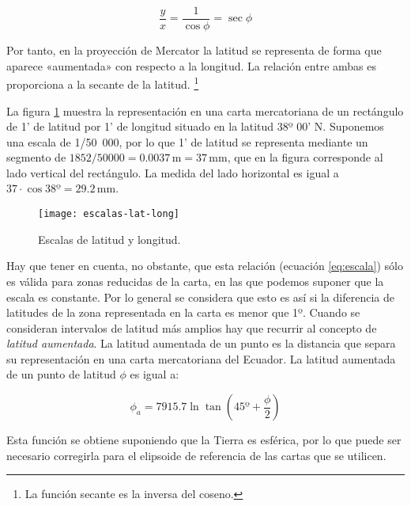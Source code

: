 \begin{equation}
\frac{y}{x} = \frac{1}{\cos \phi} = \sec \phi
\label{eq:escala}
\end{equation}

Por tanto, en la proyección de Mercator la latitud se representa de forma que aparece «aumentada» con respecto a la longitud. La relación entre ambas es proporciona a la secante de la latitud.%
\footnote{La función secante es la inversa del coseno.} 

\begin{ejemplo}
 La figura \ref{fg:escalas-lat-long} muestra la representación en una carta mercatoriana de un rectángulo de 
1’ de latitud por 1’ de longitud situado en la latitud 38º 00’ N. Suponemos una escala de 1/50~000, por lo que 1' de latitud se representa mediante un segmento de $1852/50000 = 0.0037\,\mbox{m} = 37\, \mbox{mm}$,  que en la figura corresponde al lado vertical del rectángulo. La medida del lado horizontal es igual a $37 \cdot \cos 38º = 29.2\, \mbox{mm}$.
\end{ejemplo}

\begin{figure}[hbtp]
\begin{center}
\texttt{[image: escalas-lat-long]}\\
\caption{Escalas de latitud y longitud.}
\label{fg:escalas-lat-long}
\end{center}
\end{figure}


Hay que tener en cuenta, no obstante, que esta relación (ecuación \ref{eq:escala}) sólo es válida para zonas reducidas de la carta, en las que podemos suponer que la escala es constante. Por lo general se considera que esto es así si la diferencia de latitudes de la zona representada en la carta es menor que 1º. 
Cuando se consideran intervalos de latitud más amplios hay que recurrir al concepto de \emph{ latitud aumentada}. 
La latitud aumentada de un punto es la distancia que separa su representación en una carta mercatoriana del Ecuador. La latitud aumentada de un punto de latitud $\phi$ es igual a:
 

\begin{equation}
\phi_{a} = 7915.7 \ln \tan \left( 45º+ \frac{\phi}{2}\right)
\end{equation}

Esta función se obtiene suponiendo que la Tierra es esférica, por lo que puede ser 
necesario corregirla para el elipsoide de referencia de las cartas que se utilicen. 

